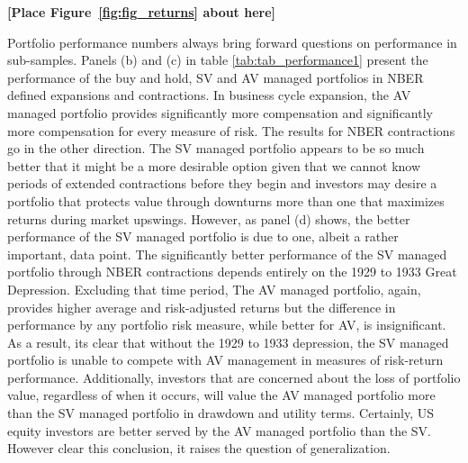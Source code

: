 \bigskip
\centerline{\bf [Place Figure~\ref{fig:fig_returns} about here]}
\bigskip

Portfolio performance numbers always bring forward questions on performance in sub-samples. 
Panels (b) and (c) in table \ref{tab:tab_performance1} present the performance of the buy and hold, SV and AV managed portfolios in NBER defined expansions and contractions. In business cycle expansion, the AV managed portfolio provides significantly more compensation and significantly more compensation for every measure of risk. The results for NBER contractions go in the other direction. The SV managed portfolio appears to be so much better that it might be a more desirable option given that we cannot know periods of extended contractions before they begin and investors may desire a portfolio that protects value through downturns more than one that maximizes returns during market upswings. However, as panel (d) shows, the better performance of the SV managed portfolio is due to one, albeit a rather important, data point. The significantly better performance of the SV managed portfolio through NBER contractions depends entirely on the 1929 to 1933 Great Depression. Excluding that time period, The AV managed portfolio, again, provides higher average and risk-adjusted returns but the difference in performance by any portfolio risk measure, while better for AV, is insignificant. As a result, its clear that without the 1929 to 1933 depression, the SV managed portfolio is unable to compete with AV management in measures of risk-return performance. Additionally, investors that are concerned about the loss of portfolio value, regardless of when it occurs, will value the AV managed portfolio more than the SV managed portfolio in drawdown and utility terms. Certainly, US equity investors are better served by the AV managed portfolio than the SV. However clear this conclusion, it raises the question of generalization. 
